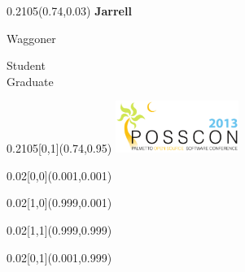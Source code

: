 \documentclass[a4paper]{article}
\begin{document}
\begin{textblock}{0.2105}(0.74,0.03)
  {\fontsize{36}{40} \textbf{Jarrell} } \\
  \begin{Large} Waggoner \end{Large}

  \vspace{2em}

  Student \\ Graduate
\end{textblock}

\begin{textblock}{0.2105}[0,1](0.74,0.95)
  \includegraphics[width=4cm]{fig/logo}
\end{textblock}


\begin{textblock}{0.02}[0,0](0.001,0.001)
\end{textblock}

\begin{textblock}{0.02}[1,0](0.999,0.001)
\end{textblock}

\begin{textblock}{0.02}[1,1](0.999,0.999)
\end{textblock}

\begin{textblock}{0.02}[0,1](0.001,0.999)
\end{textblock}

\end{document}
